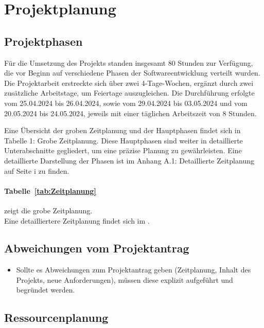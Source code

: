 \section{Projektplanung} 
\label{sec:Projektplanung}


\subsection{Projektphasen}
\label{sec:Projektphasen}

Für die Umsetzung des Projekts standen insgesamt 80 Stunden zur Verfügung, die vor Beginn auf verschiedene Phasen der Softwareentwicklung verteilt wurden. Die Projektarbeit erstreckte sich über zwei 4-Tage-Wochen, ergänzt durch zwei zusätzliche Arbeitstage, um Feiertage auszugleichen. Die Durchführung erfolgte vom 25.04.2024 bis 26.04.2024, sowie vom 29.04.2024 bis 03.05.2024 und vom 20.05.2024 bis 24.05.2024, jeweils mit einer täglichen Arbeitszeit von 8 Stunden.

Eine Übersicht der groben Zeitplanung und der Hauptphasen findet sich in Tabelle 1: Grobe Zeitplanung. Diese Hauptphasen sind weiter in detaillierte Unterabschnitte gegliedert, um eine präzise Planung zu gewährleisten. Eine detaillierte Darstellung der Phasen ist im Anhang A.1: Detaillierte Zeitplanung auf Seite i zu finden.

\paragraph{Tabelle~\ref{tab:Zeitplanung}} zeigt die grobe Zeitplanung.
\\
Eine detailliertere Zeitplanung findet sich im .


\subsection{Abweichungen vom Projektantrag}
\label{sec:AbweichungenProjektantrag}

\begin{itemize}
	\item Sollte es Abweichungen zum Projektantrag geben (\zB Zeitplanung, Inhalt des Projekts, neue Anforderungen), müssen diese explizit aufgeführt und begründet werden.
\end{itemize}


\subsection{Ressourcenplanung}
\label{sec:Ressourcenplanung}

